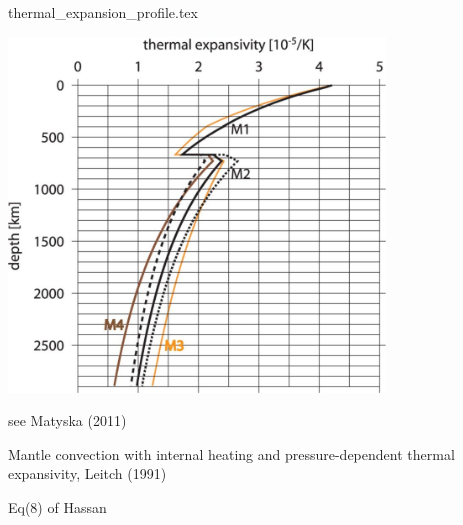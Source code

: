 \begin{flushright} {\tiny {\color{gray} thermal\_expansion\_profile.tex}} \end{flushright}

\includegraphics[width=10cm]{images/thermal_expansion/stca06.jpg}

see Matyska \etal (2011) \cite{mayw11}

Mantle convection with internal heating and pressure-dependent thermal expansivity, Leitch \etal (1991) \cite{leys91}

Eq(8) of Hassan \etal \cite{hafg15}
